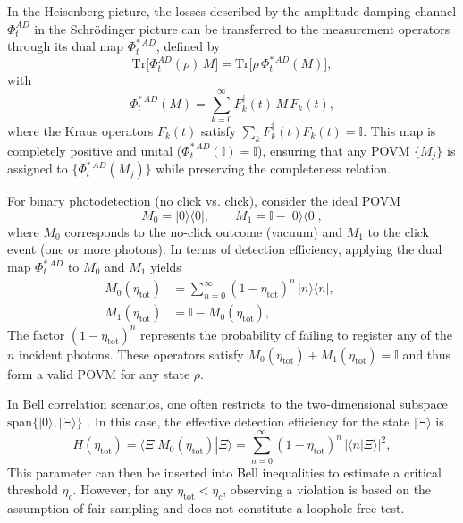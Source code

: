 \documentclass[aps,pra,reprint, superscriptaddress,showkeys]{revtex4-2}
\theoremstyle{plain}
\begin{document}
In the Heisenberg picture, the losses described by the amplitude-damping channel $\Phi_t^{AD}$ in the Schrödinger picture can be transferred to the measurement operators through its dual map $\Phi_t^{*\,AD}$, defined by
\begin{equation}
    \mathrm{Tr}\bigl[\Phi_t^{AD}(\rho)\,M\bigr]
    = \mathrm{Tr}\bigl[\rho\,\Phi_t^{*\,AD}(M)\bigr],
\end{equation}
with
\begin{equation*}
    \Phi_t^{*\,AD}(M)
    = \sum_{k=0}^{\infty}F_k^\dagger(t)\,M\,F_k(t),
\end{equation*}
where the Kraus operators \(F_k(t)\) satisfy $\sum_kF_k^\dagger(t)F_k(t)=\mathbb{I}$. This map is completely positive and unital ($\Phi_t^{*\,AD}(\mathbb{I})=\mathbb{I}$), ensuring that any POVM $\{M_j\}$ is assigned to $\{\Phi_t^{*\,AD}(M_j)\}$ while preserving the completeness relation.

For binary photodetection (no click vs. click), consider the ideal POVM  
\begin{equation*}
    M_0 = \lvert0\rangle\langle0\rvert,
    \qquad
    M_1 = \mathbb{I}-\lvert0\rangle\langle0\rvert,
\end{equation*} 
where $M_0$ corresponds to the no-click outcome (vacuum) and $M_1$ to the click event (one or more photons). In terms of detection efficiency, applying the dual map $\Phi_t^{*\,AD}$ to $M_0$ and $M_1$ yields  
\begin{equation}
\begin{aligned}
    M_0(\eta_{\mathrm{tot}}) &= \sum_{n=0}^{\infty}(1-\eta_{\mathrm{tot}})^n\,\lvert n\rangle\langle n\rvert,
    \qquad  \\
    M_1(\eta_{\mathrm{tot}}) &= \mathbb{I}- M_0(\eta_{\mathrm{tot}}),
\end{aligned}
\end{equation}
The factor $(1-\eta_{\mathrm{tot}})^n$ represents the probability of failing to register any of the $n$ incident photons. These operators satisfy  
$M_0(\eta_{\mathrm{tot}})+M_1(\eta_{\mathrm{tot}})=\mathbb{I}$ and thus form a valid POVM for any state $\rho$.

In Bell correlation scenarios, one often restricts to the two-dimensional subspace $\mathrm{span}\{\lvert0\rangle,|\Xi\rangle\}$ \cite{Quintino_2012,araujo2012}. In this case, the effective detection efficiency for the state $\lvert\Xi\rangle$ is
\begin{equation}
    H(\eta_{\mathrm{tot}})
    = \langle\Xi|M_0(\eta_{\mathrm{tot}})|\Xi\rangle
    = \sum_{n=0}^{\infty}(1-\eta_\mathrm{tot})^n\,\bigl|\langle n|\Xi\rangle\bigr|^2,
\end{equation}
This parameter can then be inserted into Bell inequalities to estimate a critical threshold $\eta_c$. However, for any $\eta_{\mathrm{tot}}<\eta_c$, observing a violation is based on the assumption of fair-sampling and does not constitute a loophole-free test.
\end{document}
